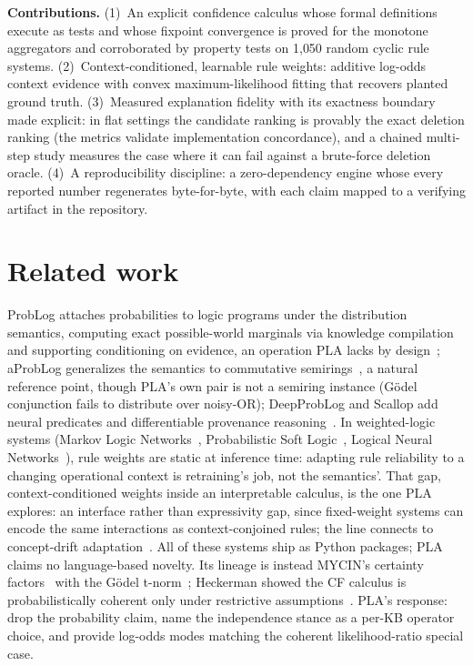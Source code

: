 \documentclass[10pt]{article}
\begin{document}
\textbf{Contributions.} (1)~An explicit confidence calculus whose formal
definitions execute as tests and whose fixpoint convergence is proved
for the monotone aggregators and corroborated by property tests on
1{,}050 random cyclic rule systems. (2)~Context-conditioned,
learnable rule weights: additive log-odds context evidence with convex
maximum-likelihood fitting that recovers planted ground truth. (3)~Measured
explanation fidelity with its exactness boundary made explicit: in
flat settings the candidate ranking is provably the exact deletion
ranking (the metrics validate implementation concordance), and a
chained multi-step study measures the case where it can fail against
a brute-force deletion oracle. (4)~A reproducibility discipline: a zero-dependency
engine whose every reported number regenerates byte-for-byte, with each
claim mapped to a verifying artifact in the repository.

\section{Related work}\label{sec:related}
ProbLog attaches probabilities to logic programs under the distribution
semantics, computing exact possible-world marginals via knowledge
compilation and supporting conditioning on evidence, an operation PLA
lacks by design~\cite{deraedt2007,fierens2015}; aProbLog generalizes
the semantics to commutative semirings~\cite{kimmig2011}, a natural
reference point, though PLA's own pair is not a semiring instance
(G\"odel conjunction fails to distribute over noisy-OR); DeepProbLog and
Scallop add neural predicates and differentiable provenance
reasoning~\cite{manhaeve2018,li2023}. In weighted-logic systems
(Markov
Logic Networks~\cite{richardson2006}, Probabilistic Soft
Logic~\cite{bach2017}, Logical Neural Networks~\cite{riegel2020}), rule
weights are static at inference time: adapting rule reliability to a
changing operational context is retraining's job, not the semantics'.
That gap, context-conditioned weights inside an interpretable calculus,
is the one PLA explores: an interface rather than expressivity gap,
since fixed-weight systems can encode the same interactions as
context-conjoined rules; the line connects to concept-drift
adaptation~\cite{gama2014}. All of these systems ship as Python packages;
PLA claims no language-based novelty. Its lineage is instead MYCIN's
certainty factors~\cite{shortliffe1975} with the G\"odel
t-norm~\cite{zadeh1965}; Heckerman showed the CF calculus is
probabilistically coherent only under restrictive
assumptions~\cite{heckerman1986,heckerman1992}. PLA's response: drop the
probability claim, name the independence stance as a per-KB operator
choice, and provide log-odds modes matching the coherent likelihood-ratio
special case.
\end{document}
